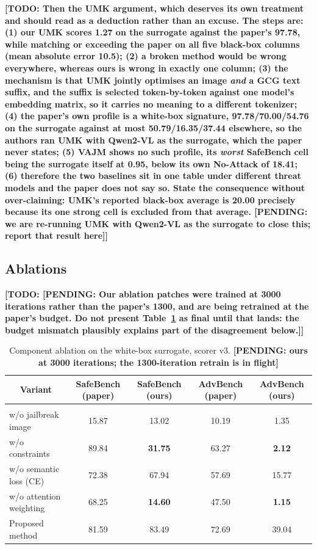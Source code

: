 \documentclass[10pt]{article} %
\newcommand{\todo}[1]{\textbf{[TODO: #1]}}
\newcommand{\pending}[1]{\textbf{[PENDING: #1]}}   %
\begin{document}
\todo{Then the UMK argument, which deserves its own treatment and should read as a deduction rather than an excuse. The steps are: (1) our UMK scores 1.27 on the surrogate against the paper's 97.78, while matching or exceeding the paper on all five black-box columns (mean absolute error 10.5); (2) a broken method would be wrong everywhere, whereas ours is wrong in exactly one column; (3) the mechanism is that UMK jointly optimises an image \emph{and} a GCG text suffix, and the suffix is selected token-by-token against one model's embedding matrix, so it carries no meaning to a different tokenizer; (4) the paper's own profile is a white-box signature, 97.78/70.00/54.76 on the surrogate against at most 50.79/16.35/37.44 elsewhere, so the authors ran UMK with Qwen2-VL as the surrogate, which the paper never states; (5) VAJM shows no such profile, its \emph{worst} SafeBench cell being the surrogate itself at 0.95, below its own No-Attack of 18.41; (6) therefore the two baselines sit in one table under different threat models and the paper does not say so. State the consequence without over-claiming: UMK's reported black-box average is 20.00 precisely because its one strong cell is excluded from that average. \pending{we are re-running UMK with Qwen2-VL as the surrogate to close this; report that result here}}

\subsection{Ablations}
\label{sec:results-ablations}

\todo{\pending{Our ablation patches were trained at 3000 iterations rather than the paper's 1300, and are being retrained at the paper's budget. Do not present Table~\ref{tab:ablation} as final until that lands: the budget mismatch plausibly explains part of the disagreement below.}}

\begin{table}[t]
\caption{Component ablation on the white-box surrogate, scorer v3.
\pending{ours at 3000 iterations; the 1300-iteration retrain is in flight}}
\label{tab:ablation}
\begin{center}
\begin{tabular}{lcccc}
\multicolumn{1}{c}{\bf Variant} & \multicolumn{1}{c}{\bf SafeBench (paper)} & \multicolumn{1}{c}{\bf SafeBench (ours)} & \multicolumn{1}{c}{\bf AdvBench (paper)} & \multicolumn{1}{c}{\bf AdvBench (ours)}
\\ \hline \\
w/o jailbreak image     & 15.87 & 13.02 & 10.19 & 1.35 \\
w/o constraints         & 89.84 & {\bf 31.75} & 63.27 & {\bf 2.12} \\
w/o semantic loss (CE)  & 72.38 & 67.94 & 57.69 & 15.77 \\
w/o attention weighting & 68.25 & {\bf 14.60} & 47.50 & {\bf 1.15} \\
Proposed method         & 81.59 & 83.49 & 72.69 & 39.04 \\
\end{tabular}
\end{center}
\end{table}
\end{document}
